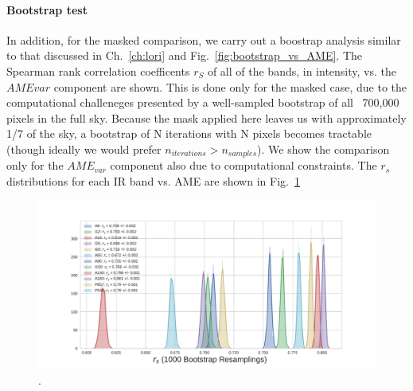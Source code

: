           \paragraph{Bootstrap test}
              In addition, for the masked comparison, we carry out a boostrap analysis similar to that discussed in Ch.~\ref{ch:lori} and Fig.~\ref{fig:bootstrap_vs_AME}. The Spearman rank correlation coefficents $r_{S}$ of all of the bands, in intensity, vs. the $AME{var}$ component are shown. This is done only for the masked case, due to the computational challeneges presented by a well-sampled bootstrap of all ~700,000 pixels in the full sky. Because the mask applied here leaves us with approximately 1/7 of the sky, a bootstrap of N iterations with N pixels becomes tractable (though ideally we would prefer $n_{iterations} > n_{samples}$). We show the comparison only for the $AME_{var}$ component also due to computational constraints. The $r_{s}$ distributions for each IR band vs. AME are shown in Fig.~\ref{fig:bootstrap_vs_AME_allsky_masked}
              \begin{figure}
                   \includegraphics[width=\textwidth]{../Plots/ch_allsky/bootstrap_vs_AME_spearman_maskall_i1000.pdf}
                   \centering
                   \caption{.}
                   \label{fig:bootstrap_vs_AME_allsky_masked}
              \end{figure}

